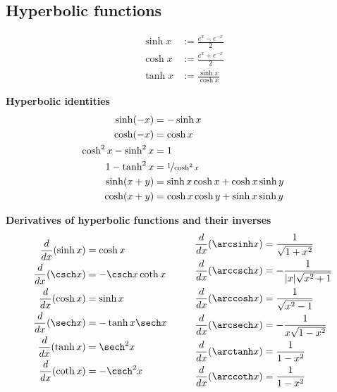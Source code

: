 \documentclass{article}
\begin{document}
\subsection{Hyperbolic functions}
\begin{definition}
    \begin{align*}
        \sinh x & := \frac{e^x-e^{-x}}{2}    \\
        \cosh x & := \frac{e^x+e^{-x}}{2}    \\
        \tanh x & := \frac{\sinh x}{\cosh x}
    \end{align*}
\end{definition}
\begin{theorem}
    \textbf{Hyperbolic identities}
    \begin{align*}
        \sinh(-x)           & = -\sinh x                          \\
        \cosh(-x)           & = \cosh x                           \\
        \cosh^2x - \sinh^2x & = 1                                 \\
        1-\tanh^2 x         & = \nicefrac{1}{\cosh^2x}            \\
        \sinh(x+y)          & =\sinh x \cosh x + \cosh x \sinh y  \\
        \cosh(x+y)          & = \cosh x \cosh y + \sinh x \sinh y
    \end{align*}
\end{theorem}
\begin{theorem}
    \textbf{Derivatives of hyperbolic functions and their inverses}
    \begin{align*}
        \begin{aligned}
            \frac{d}{dx}(\sinh x) & =\cosh x           \\
            \frac{d}{dx}(\csch x) & =-\csch x \coth x  \\
            \frac{d}{dx}(\cosh x) & =\sinh x           \\
            \frac{d}{dx}(\sech x) & = -\tanh x \sech x \\
            \frac{d}{dx}(\tanh x) & =\sech^2 x         \\
            \frac{d}{dx}(\coth x) & = -\csch^2 x
        \end{aligned}
        \hspace{1cm}
        \begin{aligned}
            \frac{d}{dx}(\arcsinh x) & =\frac{1}{\sqrt{1+x^2}}     \\
            \frac{d}{dx}(\arccsch x) & =-\frac{1}{|x|\sqrt{x^2+1}} \\
            \frac{d}{dx}(\arccosh x) & =\frac{1}{\sqrt{x^2-1}}     \\
            \frac{d}{dx}(\arcsech x) & = -\frac{1}{x\sqrt{1-x^2}}  \\
            \frac{d}{dx}(\arctanh x) & =\frac{1}{1-x^2}            \\
            \frac{d}{dx}(\arccoth x) & = \frac{1}{1-x^2}
        \end{aligned}
    \end{align*}
\end{theorem}
\end{document}

